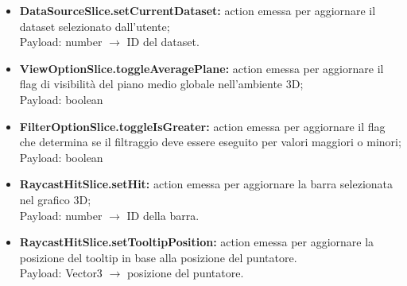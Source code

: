 \begin{itemize}
        \item \textbf{DataSourceSlice.setCurrentDataset:} action emessa per aggiornare il dataset selezionato dall'utente; \\ Payload: number $\rightarrow$ ID del dataset.
        \item \textbf{ViewOptionSlice.toggleAveragePlane:} action emessa per aggiornare il flag di visibilità del piano medio globale nell'ambiente 3D; \\ Payload: boolean 
        \item \textbf{FilterOptionSlice.toggleIsGreater:} action emessa per aggiornare il flag che determina se il filtraggio deve essere eseguito per valori maggiori o minori; \\ Payload: boolean
        \item \textbf{RaycastHitSlice.setHit:} action emessa per aggiornare la barra selezionata nel grafico 3D; \\ Payload: number $\rightarrow$ ID della barra.
        \item \textbf{RaycastHitSlice.setTooltipPosition:} action emessa per aggiornare la posizione del tooltip in base alla posizione del puntatore.\\ Payload: Vector3 $\rightarrow$ posizione del puntatore.
    \end{itemize}
